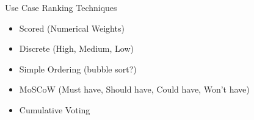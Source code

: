 \documentclass[10pt,t,a4paper]{beamer}
\begin{document}
\begin{frame}[label=sec-1-21]{Use Case Ranking Techniques}
\begin{itemize}
\item Scored (Numerical Weights)
\item Discrete (High, Medium, Low)
\item Simple Ordering (bubble sort?)
\item MoSCoW (Must have, Should have, Could have, Won't have)
\item Cumulative Voting
\end{itemize}
\end{frame}
\end{document}
